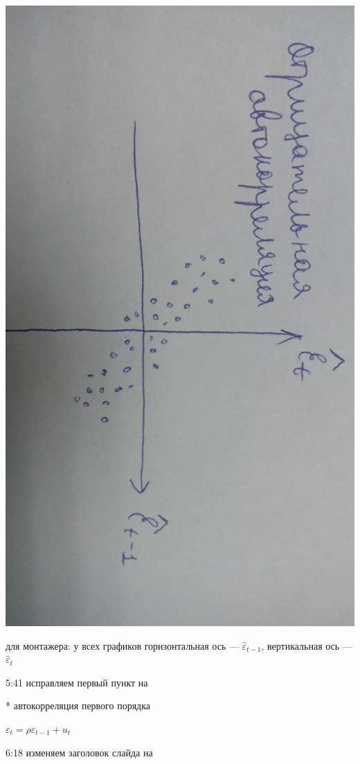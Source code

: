 \documentclass[12pt,a4paper]{article}
\newcommand{\e}{\varepsilon}
\begin{document}
\includegraphics[scale=0.05, angle=90]{autocorr_m1.jpg} 

для монтажера: у всех графиков горизонтальная ось --- $\hat{\e}_{t-1}$, вертикальная ось --- $\hat{\e}_{t}$


5:41 исправляем первый пункт на

* автокорреляция первого порядка

$\e_t=\rho \e_{t-1}+u_t$

6:18 изменяем заголовок слайда на 
\end{document}
